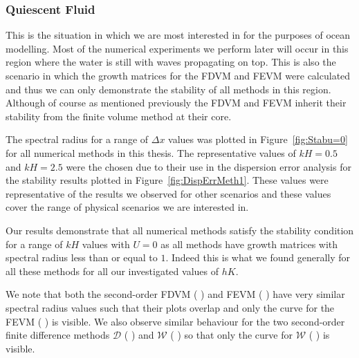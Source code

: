 \subsubsection{Quiescent Fluid}
This is the situation in which we are most interested in for the purposes of ocean modelling. Most of the numerical experiments we perform later will occur in this region where the water is still with waves propagating on top. This is also the scenario in which the growth matrices for the FDVM and FEVM were calculated and thus we can only demonstrate the stability of all methods in this region. Although of course as mentioned previously the FDVM and FEVM inherit their stability from the finite volume method at their core.

The spectral radius for a range of $\Delta x$ values was plotted in Figure~\ref{fig:Stabu=0} for all numerical methods in this thesis. The representative values of $kH =0.5$ and $kH = 2.5$ were the chosen due to their use in the dispersion error analysis for the stability results plotted in Figure~\ref{fig:DispErrMeth1}. These values were representative of the results we observed for other scenarios and these values cover the range of physical scenarios we are interested in. 

Our results demonstrate that all numerical methods satisfy the stability condition for a range of $kH$ values with $U=0$ as all methods have growth matrices with spectral radius less than or equal to $1$. Indeed this is what we found generally for all these methods for all our investigated values of $hK$.

We note that both the second-order FDVM ({\color{red} \solidrule}) and FEVM ({\color{blue} \solidrule}) have very similar spectral radius values such that their plots overlap and only the curve for the FEVM ({\color{blue} \solidrule}) is visible. We also observe similar behaviour for the two second-order finite difference methods $\mathcal{D}$ ({\color{violet!80!white} \solidrule}) and $\mathcal{W}$ ({\color{orange} \solidrule}) so that only the curve for $\mathcal{W}$ ({\color{orange} \solidrule}) is visible.

